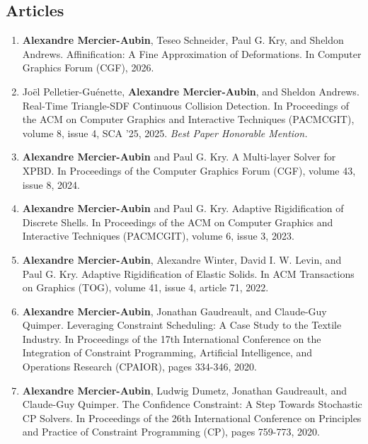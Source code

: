 \documentclass[10pt]{article} %
\begin{document}
\subsection{Articles}
%
%
\begin{enumerate}
  \setcounter{enumi}{\value{listCounter}}
  \item \textbf{Alexandre Mercier-Aubin}, Teseo Schneider, Paul G. Kry, and Sheldon Andrews. Affinification: A Fine Approximation of Deformations. In Computer Graphics Forum (CGF), 2026. 

\item Joël Pelletier-Guénette, \textbf{Alexandre Mercier-Aubin}, and Sheldon Andrews. Real-Time Triangle-SDF Continuous Collision Detection. In Proceedings of the ACM on Computer Graphics and Interactive Techniques (PACMCGIT), volume 8, issue 4, SCA '25, 2025. \textit{Best Paper Honorable Mention.} 

\item \textbf{Alexandre Mercier-Aubin} and Paul G. Kry. A Multi-layer Solver for XPBD. In Proceedings of the Computer Graphics Forum (CGF), volume 43, issue 8, 2024. 

 \item \textbf{Alexandre Mercier-Aubin} and Paul G. Kry. Adaptive Rigidification of Discrete Shells. In Proceedings of the ACM on Computer Graphics and Interactive Techniques (PACMCGIT), volume 6, issue 3, 2023. 

 \item \textbf{Alexandre Mercier-Aubin},  Alexandre Winter,  David I. W. Levin, and Paul G. Kry. Adaptive Rigidification of Elastic Solids. In ACM Transactions on Graphics (TOG), volume 41, issue 4, article 71, 2022.  

 \item \textbf{Alexandre Mercier-Aubin}, Jonathan Gaudreault, and Claude-Guy Quimper. Leveraging Constraint Scheduling: A Case Study to the Textile Industry. In Proceedings of the 17th International Conference on the Integration of Constraint Programming, Artificial Intelligence, and Operations Research (CPAIOR), pages 334-346, 2020. 

  \item \textbf{Alexandre Mercier-Aubin}, Ludwig Dumetz, Jonathan Gaudreault, and Claude-Guy Quimper. The Confidence Constraint: A Step Towards Stochastic CP Solvers. In Proceedings of the 26th International Conference on Principles and Practice of Constraint Programming (CP), pages 759-773, 2020. 
\end{enumerate}
\end{document}
